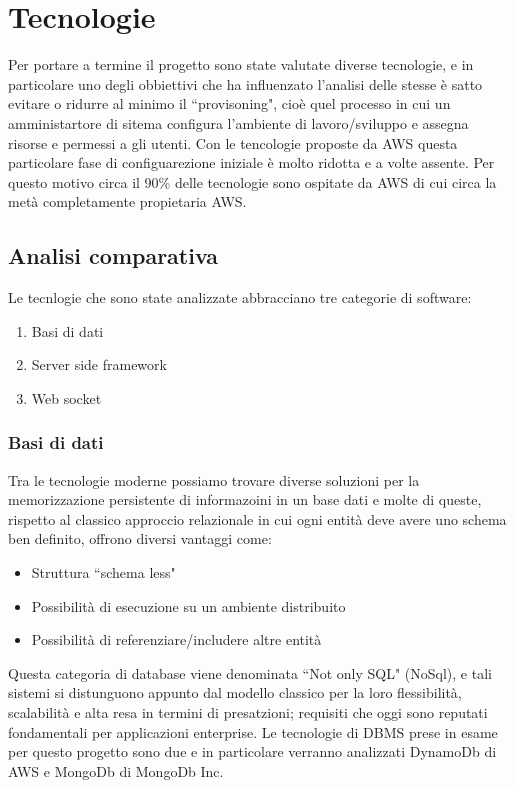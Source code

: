 \chapter{Tecnologie}

Per portare a termine il progetto sono state valutate diverse tecnologie, e in particolare uno degli obbiettivi che ha influenzato l'analisi delle stesse è satto evitare o ridurre al minimo il ``provisoning",  cioè quel processo in cui un amministartore di sitema configura l'ambiente di lavoro/sviluppo e assegna risorse e permessi a gli utenti. Con le tencologie proposte da AWS questa particolare fase di configuarezione iniziale è molto ridotta e a volte assente. Per questo motivo circa il 90\% delle tecnologie sono ospitate da AWS di cui circa la metà completamente propietaria AWS.


\section{Analisi comparativa}
Le tecnlogie che sono state analizzate abbracciano tre categorie di software:
\begin{enumerate}
	\item Basi di dati
	\item Server side framework
	\item Web socket
\end{enumerate}

\subsection{Basi di dati}
Tra le tecnologie moderne possiamo trovare diverse soluzioni per la memorizzazione persistente di informazoini in un base dati e molte di queste, rispetto al classico approccio relazionale in cui ogni entità deve avere uno schema ben definito, offrono diversi vantaggi come:
\begin{itemize}
	\item Struttura ``schema less"
	\item Possibilità di esecuzione su un ambiente distribuito
	\item Possibilità di referenziare/includere altre entità
\end{itemize}
Questa categoria di database viene denominata ``Not only SQL" (NoSql), e tali sistemi si distunguono appunto dal modello classico per la loro flessibilità, scalabilità e alta resa in termini di presatzioni; requisiti che oggi sono reputati fondamentali per applicazioni enterprise.
Le tecnologie di DBMS prese in esame per questo progetto sono due e in particolare verranno analizzati DynamoDb di AWS e MongoDb di MongoDb Inc. 
